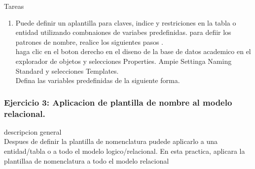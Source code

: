\documentclass[12pt,letterpaper]{article}
\begin{document}
Tareas
\begin{enumerate}[1.]
    \item Puede definir un aplantilla para claves, indice y restriciones en la tabla o entidad utilizando combnaiones de variabes predefinidas. para defiir los patrones de nombre, realice los siguientes pasos .  \\
haga clic en el boton derecho en el diseno de la base de datos academico en el explorador de objetos y selecciones Properties. Ampie Settinga Naming Standard y selecciones Templates. \\
 Defina las variables predefinidas de la siguiente forma. 
    
		\end{enumerate}
		\subsubsection{Ejercicio 3: Aplicacion de plantilla de nombre al modelo relacional.}
		descripcion general  \\
Despues de definir la plantilla de nomenclatura pudede aplicarlo a una entidad/tabla o a todo el modelo logico/relacional. En esta practica, aplicara la plantillaa de nomenclatura a todo el modelo relacional \\
\end{document}
